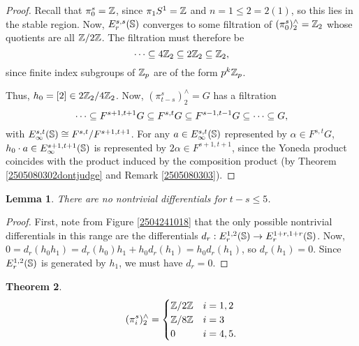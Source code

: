 \documentclass[11pt, titlepage]{article} %
\def\bb{\ensuremath\mathbb}
\def\subq{\ensuremath\subseteq}
\def\inte{\ensuremath\mathbb{Z}}
\numberwithin{equation}{subsection}
\theoremstyle{plain}
\newtheorem{theorem}{Theorem}[subsection]
\newtheorem{lemma}[theorem]{Lemma}
\theoremstyle{definition}
\begin{document}
\begin{proof}
Recall that \(\pi_0^s=\inte\), since \(\pi_1S^1=\inte\) and \(n=1\leq 2=2(1)\), so this lies in the stable region. Now, \(E^{s,s}_r(\bb{S})\) converges to some filtration of \((\pi_0^s)^\wedge_2=\inte_2\) whose quotients are all \(\inte/2\inte\). The filtration must therefore be 
\[\cdots\subq 4\inte_2 \subq 2\inte_2 \subq \inte_2,\]
since finite index subgroups of \(\inte_p\) are of the form \(p^k\inte_p\). %

Thus, \(h_0=[2]\in 2\inte_2/4\inte_2\). Now, \((\pi_{t-s}^s)^\wedge_2=G\) has a filtration
\[\cdots \subq F^{s+1, t+1}G\subq F^{s,t}G \subq F^{s-1,t-1}G\subq \cdots \subq G,\]
with \(E_\infty^{s,t}(\bb{S})\cong F^{s,t}/F^{s+1,t+1}\). For any \(a \in E^{s,t}_\infty(\bb{S})\) represented by \(\alpha\in F^{s,t}G\), \(h_0\cdot a \in E_\infty^{s+1,t+1}(\bb{S})\) is represented by \(2\alpha \in F^{s+1,t+1}\), since the Yoneda product coincides with the product induced by the composition product (by Theorem \ref{2505080302dontjudge} and Remark \ref{2505080303}). 
\end{proof}

\begin{lemma}\label{2504241225}
There are no nontrivial differentials for \(t-s\leq 5\). 
\end{lemma}

\begin{proof}
First, note from Figure \ref{2504241018} that the only possible nontrivial differentials in this range are the differentials \(d_r : E_r^{1,2}(\bb{S}) \to E_r^{1+r, 1+r}(\bb{S})\). Now, \(0=d_r(h_0h_1)=d_r(h_0)h_1 + h_0d_r(h_1)=h_0d_r(h_1)\), so \(d_r(h_1)=0\). Since \(E_r^{1, 2}(\bb{S})\) is generated by \(h_1\), we must have \(d_r=0\). 
\end{proof}

\begin{theorem}
\begin{align*}
(\pi_i^s)^\wedge_2 = \begin{cases}
\inte/2\inte & i = 1, 2\\
\inte/8\inte & i = 3\\
0 & i = 4, 5.
\end{cases}
\end{align*}
\end{theorem}
\end{document}
